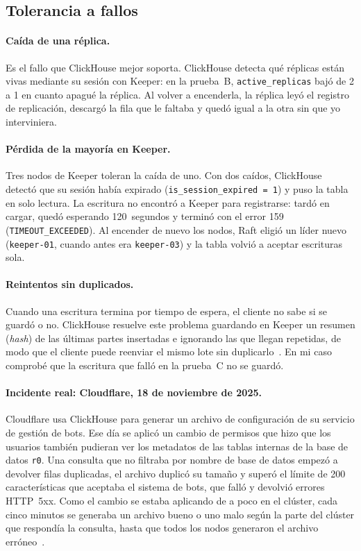 \documentclass[12pt,a4paper]{article}
\begin{document}
\subsection{Tolerancia a fallos}

\paragraph{Caída de una réplica.} Es el fallo que ClickHouse mejor
soporta. ClickHouse detecta qué réplicas están vivas mediante su sesión
con Keeper: en la prueba~B, \texttt{active\_replicas} bajó de 2 a 1 en
cuanto apagué la réplica. Al volver a encenderla, la réplica leyó el
registro de replicación, descargó la fila que le faltaba y quedó igual a
la otra sin que yo interviniera.

\paragraph{Pérdida de la mayoría en Keeper.} Tres nodos de Keeper
toleran la caída de uno. Con dos caídos, ClickHouse detectó que su
sesión había expirado (\texttt{is\_session\_expired = 1}) y puso la tabla
en solo lectura. La escritura no encontró a Keeper para registrarse:
tardó en cargar, quedó esperando 120~segundos y terminó con el
error 159 (\texttt{TIMEOUT\_EXCEEDED}). Al encender de nuevo los nodos,
Raft eligió un líder nuevo (\texttt{keeper-01}, cuando antes era
\texttt{keeper-03}) y la tabla volvió a aceptar escrituras sola.

\paragraph{Reintentos sin duplicados.} Cuando una escritura termina por
tiempo de espera, el cliente no sabe si se guardó o no. ClickHouse
resuelve este problema guardando en Keeper un resumen (\emph{hash}) de
las últimas partes insertadas e ignorando las que llegan repetidas, de
modo que el cliente puede reenviar el mismo lote sin
duplicarlo~\cite[p.~3736]{schulze2024}. En mi caso comprobé que la
escritura que falló en la prueba~C no se guardó.

\paragraph{Incidente real: Cloudflare, 18 de noviembre de 2025.} Cloudflare
usa ClickHouse para generar un archivo de configuración de su servicio
de gestión de bots. Ese día se aplicó un cambio de permisos que hizo
que los usuarios también pudieran ver los metadatos de las tablas
internas de la base de datos \texttt{r0}. Una consulta que no filtraba por nombre de base de datos
empezó a devolver filas duplicadas, el archivo duplicó su tamaño y
superó el límite de 200 características que aceptaba el sistema de
bots, que falló y devolvió errores HTTP~5xx. Como el cambio se estaba
aplicando de a poco en el clúster, cada cinco minutos se generaba un
archivo bueno o uno malo según la parte del clúster que respondía la
consulta, hasta que todos los nodos generaron el archivo erróneo~\cite{cloudflare2025}.
\end{document}
